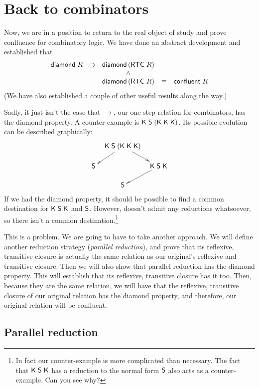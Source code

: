 \section{Back to combinators}
\label{sec:Return-to-Land}

Now, we are in a position to return to the real object of study and
prove confluence for combinatory logic.  We have done an abstract
development and established that\[
\begin{array}{ccccc}
{\sf diamond}\;R & \supset & {\sf diamond}\,({\sf RTC}\;R)\\
& & \land\\
& & {\sf diamond}\,({\sf RTC}\;R) & \equiv & {\sf confluent}\;R\\
\end{array}
\]  (We have also established a couple of other useful results along
the way.)

\newcommand{\topk}{\KC\;\SC\;(\KC\;\KC\;\KC)} Sadly, it just isn't the
case that $\rightarrow$, our one-step relation for combinators, has
the diamond property.  A counter-example is $\topk$.  Its possible evolution
can be described graphically: \[\xymatrix @R=5mm @C=2.5mm {
& \topk \ar[dl] \ar[dr] & \\
\SC & & \KC\;\SC\;\KC \ar[dl] \\
& \SC}\]
If we had the diamond property, it should be possible to find a common
destination for ${\sf K}\;{\sf S}\;{\sf K}$ and ${\sf S}$.  However, \SC{} doesn't
admit any reductions whatsoever, so there isn't a common
destination.\footnote{In fact our counter-example is more complicated
  than necessary.  The fact that ${\sf K}\;{\sf S}\;{\sf K}$ has a
  reduction to the normal form ${\sf S}$ also acts as a counter-example.
  Can you see why?}

This is a problem.  We are going to have to take another approach.
We will define another reduction strategy (\emph{parallel reduction}),
and prove that its reflexive, transitive closure is actually the same
relation as our original's reflexive and transitive closure.  Then we
will also show that parallel reduction has the diamond property.  This
will establish that its reflexive, transitive closure has it too.
Then, because they are the same relation, we will have that the
reflexive, transitive closure of our original relation has the diamond
property, and therefore, our original relation will be confluent.

\subsection{Parallel reduction}
\label{sec:Parallel-Reduction}

